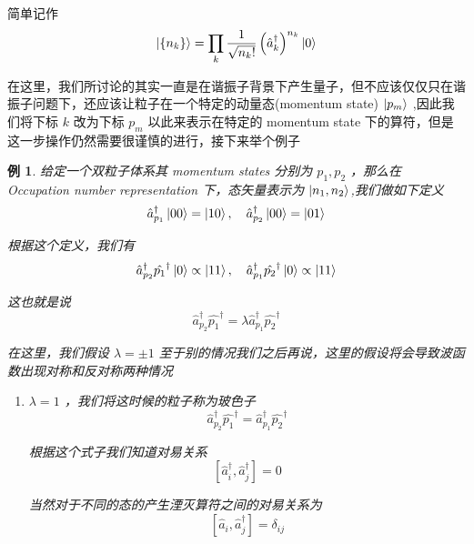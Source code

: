 \documentclass{article}
\newtheorem{example}{例}
\begin{document}
简单记作
\begin{equation*}
    \ket{\left\{n_k\right\}} = \prod_k \frac{1}{\sqrt{n_k!}}\left(\hat{a}_k^\dagger\right)^{n_k}\ket{0}
\end{equation*}

在这里，我们所讨论的其实一直是在谐振子背景下产生量子，但不应该仅仅只在谐振子问题下，还应该让粒子在一个特定的动量态(momentum state) $\ket{p_m}$ ,因此我们将下标 $k$ 改为下标 $p_m$ 以此来表示在特定的 momentum state 下的算符，但是这一步操作仍然需要很谨慎的进行，接下来举个例子

\begin{example}
    给定一个双粒子体系其 momentum states 分别为 $p_1,p_2$ ，那么在 Occupation number representation 下，态矢量表示为 $\ket{n_1,n_2}$,我们做如下定义
    \begin{equation*}
        \hat{a}_{p_1}^\dagger \ket{00} = \ket{10} ,\quad \hat{a}_{p_2}^\dagger \ket{00} = \ket{01}
    \end{equation*}

    根据这个定义，我们有 
    \begin{equation*}
        \hat{a}_{p_2}^\dagger\hat{p_1}^\dagger \ket{0} \propto \ket{11} ,\quad \hat{a}_{p_1}^\dagger\hat{p_2}^\dagger \ket{0} \propto \ket{11}
    \end{equation*}

    这也就是说 
    \begin{equation*}
        \hat{a}_{p_2}^\dagger\hat{p_1}^\dagger = \lambda \hat{a}_{p_1}^\dagger\hat{p_2}^\dagger
    \end{equation*}

    在这里，我们假设 $\lambda = \pm 1$ 至于别的情况我们之后再说，这里的假设将会导致波函数出现对称和反对称两种情况
    \begin{enumerate}
        \item[case 1] $\lambda = 1$ ，我们将这时候的粒子称为玻色子
        \begin{equation*}
            \hat{a}_{p_2}^\dagger\hat{p_1}^\dagger = \hat{a}_{p_1}^\dagger\hat{p_2}^\dagger
        \end{equation*}

        根据这个式子我们知道对易关系
        \begin{equation*}
            \left[\hat{a}_i^\dagger,\hat{a}_j^\dagger\right] = 0
        \end{equation*}

        当然对于不同的态的产生湮灭算符之间的对易关系为
        \begin{equation*}
            \left[\hat{a}_i,\hat{a}_j^\dagger\right] = \delta_{ij}
        \end{equation*}


\end{enumerate}
\end{example}
\end{document}
